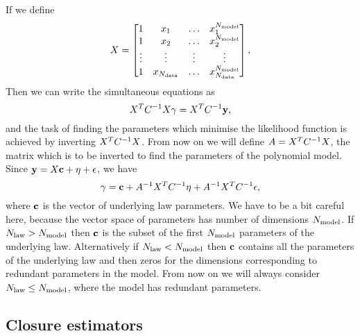 If we define
\begin{equation}
    X =
    \begin{bmatrix}
        1  & x_1 & \ldots& x_1^{N_{\rm model}} \\ 
        1  & x_2 & \ldots& x_2^{N_{\rm model}} \\ 
        \vdots  & \vdots & \vdots& \vdots \\ 
        1  & x_{N_{\rm data}} & \ldots & x_{N_{\rm data}}^{N_{\rm model}} 
    \end{bmatrix},
\end{equation}
Then we can write the simultaneous equations as
\begin{equation}
    X^T C^{-1}_{} X \mathbf{\gamma} = X^T C^{-1}_{} \mathbf{y},
\end{equation}
and the task of finding the parameters which minimise the likelihood function is
achieved by inverting $X^T C^{-1}_{} X$. From now on we will define
$A = X^T C^{-1}_{} X$, the matrix which is to be inverted to find the parameters
of the polynomial model.
Since $\mathbf{y} = X \mathbf{c} + \mathbf{\eta} + \mathbf{\epsilon}$, we have
\begin{equation}
    \mathbf{\gamma} = \mathbf{c} + A^{-1} X^T C^{-1}_{} \mathbf{\eta} + A^{-1} X^T C^{-1}_{} \mathbf{\epsilon},
\end{equation}
where $\mathbf{c}$ is the vector of underlying law parameters. We have to be a bit
careful here, because the vector space of parameters has number of dimensions
$N_{\rm model}$. If $N_{\rm law} > N_{\rm model}$ then $\mathbf{c}$ is the subset of the first
$N_{\rm model}$ parameters of the underlying law. Alternatively if $N_{\rm law} < N_{\rm model}$
then $\mathbf{c}$ contains all the parameters of the underlying law and then zeros
for the dimensions corresponding to redundant parameters in the model. From
now on we will always consider $N_{\rm law} \leq N_{\rm model}$, where the model has
redundant parameters.

\subsection{Closure estimators}

